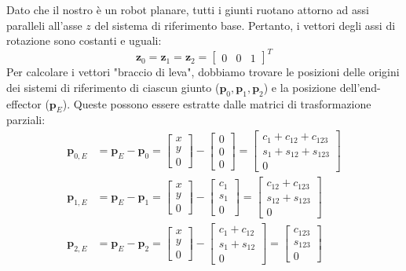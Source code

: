 ﻿\documentclass[11pt, a4paper]{article}
\begin{document}
Dato che il nostro è un robot planare, tutti i giunti ruotano attorno ad assi paralleli all'asse $z$ del sistema di riferimento base. Pertanto, i vettori degli assi di rotazione sono costanti e uguali:
\[
    \bm{z}_0 = \bm{z}_1 = \bm{z}_2 = \begin{bmatrix} 0 & 0 & 1 \end{bmatrix}^T
\]
Per calcolare i vettori "braccio di leva", dobbiamo trovare le posizioni delle origini dei sistemi di riferimento di ciascun giunto ($\bm{p}_0, \bm{p}_1, \bm{p}_2$) e la posizione dell'end-effector ($\bm{p}_E$). Queste possono essere estratte dalle matrici di trasformazione parziali:
\[
\begin{aligned}
    \bm{p}_{0,E} &= \bm{p}_E - \bm{p}_0 = \begin{bmatrix} x \\ y \\ 0 \end{bmatrix} - \begin{bmatrix} 0 \\ 0 \\ 0 \end{bmatrix} = \begin{bmatrix} c_1+c_{12}+c_{123} \\ s_1+s_{12}+s_{123} \\ 0 \end{bmatrix} \\
    \bm{p}_{1,E} &= \bm{p}_E - \bm{p}_1 = \begin{bmatrix} x \\ y \\ 0 \end{bmatrix} - \begin{bmatrix} c_1 \\ s_1 \\ 0 \end{bmatrix} = \begin{bmatrix} c_{12}+c_{123} \\ s_{12}+s_{123} \\ 0 \end{bmatrix} \\
    \bm{p}_{2,E} &= \bm{p}_E - \bm{p}_2 = \begin{bmatrix} x \\ y \\ 0 \end{bmatrix} - \begin{bmatrix} c_1+c_{12} \\ s_1+s_{12} \\ 0 \end{bmatrix} = \begin{bmatrix} c_{123} \\ s_{123} \\ 0 \end{bmatrix}
\end{aligned}
\]
\end{document}
